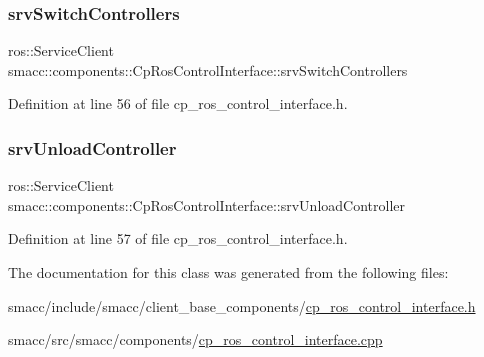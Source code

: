 \subsubsection{\texorpdfstring{srv\+Switch\+Controllers}{srvSwitchControllers}}
{\footnotesize\ttfamily ros\+::\+Service\+Client smacc\+::components\+::\+Cp\+Ros\+Control\+Interface\+::srv\+Switch\+Controllers\hspace{0.3cm}{\ttfamily [private]}}



Definition at line 56 of file cp\+\_\+ros\+\_\+control\+\_\+interface.\+h.

\mbox{\label{classsmacc_1_1components_1_1CpRosControlInterface_a0515a2a86bfcd0fdec08fabd3070723c}} 
\subsubsection{\texorpdfstring{srv\+Unload\+Controller}{srvUnloadController}}
{\footnotesize\ttfamily ros\+::\+Service\+Client smacc\+::components\+::\+Cp\+Ros\+Control\+Interface\+::srv\+Unload\+Controller\hspace{0.3cm}{\ttfamily [private]}}



Definition at line 57 of file cp\+\_\+ros\+\_\+control\+\_\+interface.\+h.



The documentation for this class was generated from the following files\+:\begin{DoxyCompactItemize}
\item 
smacc/include/smacc/client\+\_\+base\+\_\+components/\hyperlink{cp__ros__control__interface_8h}{cp\+\_\+ros\+\_\+control\+\_\+interface.\+h}\item 
smacc/src/smacc/components/\hyperlink{cp__ros__control__interface_8cpp}{cp\+\_\+ros\+\_\+control\+\_\+interface.\+cpp}\end{DoxyCompactItemize}
